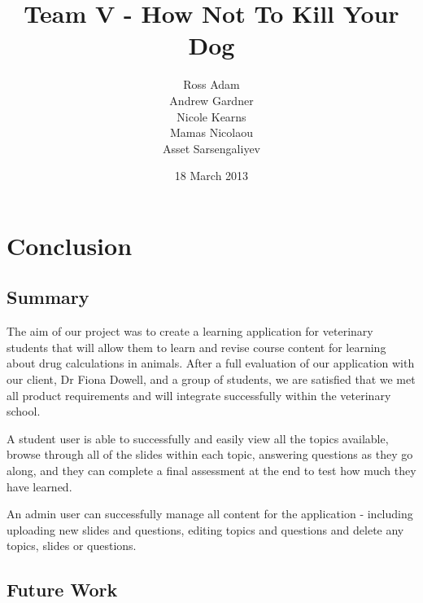 \documentclass{l3proj}
\begin{document}
\title{Team V - How Not To Kill Your Dog}
\author{Ross Adam \\
        Andrew Gardner \\
        Nicole Kearns \\
        Mamas Nicolaou \\
        Asset Sarsengaliyev}
\date{18 March 2013}
\maketitle

\tableofcontents

\chapter{Conclusion}
\label{conclusion}

\section{Summary}

The aim of our project was to create a learning application for veterinary students that will allow them to learn and revise course content for learning about drug calculations in animals. After a full evaluation of our application with our client, Dr Fiona Dowell, and a group of students, we are satisfied that we met all product requirements and will integrate successfully within the veterinary school.

A student user is able to successfully and easily view all the topics available, browse through all of the slides within each topic, answering questions as they go along, and they can complete a final assessment at the end to test how much they have learned.

An admin user can successfully manage all content for the application - including uploading new slides and questions, editing topics and questions and delete any topics, slides or questions.

\section{Future Work}

\end{document}
